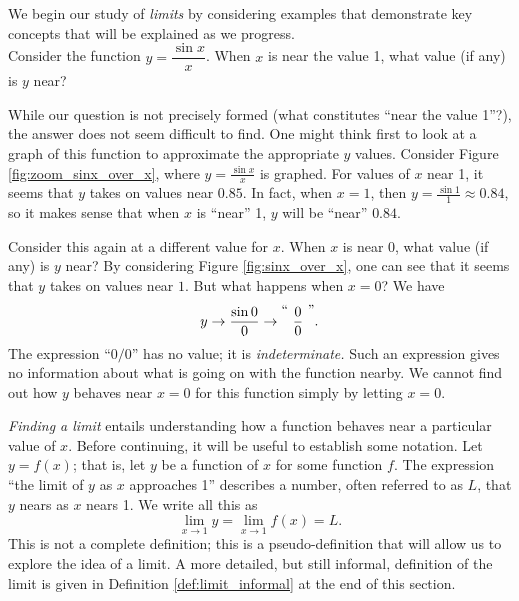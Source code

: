 We begin our study of \textit{limits} by considering examples that demonstrate key concepts that will be explained as we progress.\\

Consider the function $y = \dfrac{\sin x}{x}$. When $x$ is near the value 1, what value (if any) is $y$ near?%

While our question is not precisely formed (what constitutes ``near the value 1''?), the answer does not seem difficult to find. One might think first to look at a graph of this function to approximate the appropriate $y$ values. Consider Figure \ref{fig:zoom_sinx_over_x}, where $y = \frac{\sin x}{x}$ is graphed. For values of $x$ near 1, it seems that $y$ takes on values near $0.85$. In fact, when $x=1$, then $y=\frac{\sin 1}{1} \approx 0.84$, so it makes sense that when $x$ is ``near'' 1, $y$ will be ``near'' $0.84$.

Consider this again at a different value for $x$. When $x$ is near 0, what value (if any) is $y$ near? By considering Figure \ref{fig:sinx_over_x}, one can see that it seems that $y$ takes on values near $1$. But what happens when $x=0$? We have 
\[
 y \rightarrow \frac{\sin 0}{0} \rightarrow \raisebox{8pt}{\text{``\ }}\frac{0}{0}\raisebox{8pt}{\text{\ ''}}.
\] 
The expression ``$0/0$'' has no value; it is \emph{indeterminate.}  Such an expression gives no information about what is going on with the function nearby. We cannot find out how $y$ behaves near $x=0$ for this function simply by letting $x=0$. 

\emph{Finding a limit} entails understanding how a function behaves near a particular value of $x$. Before continuing, it will be useful to establish some notation. Let $y=f(x)$; that is, let $y$ be a function of $x$ for some function $f$. The expression ``the limit of $y$ as $x$ approaches 1'' describes a number, often referred to as $L$, that $y$ nears as $x$ nears 1. We write all this as 
\[
\lim_{x\to 1} y = \lim_{x\to 1} f(x) = L.
\]
This is not a complete definition; this is a pseudo-definition that will allow us to explore the idea of a limit.  A more detailed, but still informal, definition of the limit is given in Definition \ref{def:limit_informal} at the end of this section. 




